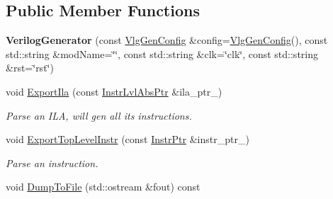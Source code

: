 \subsection*{Public Member Functions}
\begin{DoxyCompactItemize}
\item 
\mbox{\label{classilang_1_1_verilog_generator_abf9c7566b2c958bb7456fa1be6e438b0}} 
{\bfseries Verilog\+Generator} (const \mbox{\hyperlink{structilang_1_1_verilog_generator_1_1_vlg_gen_config}{Vlg\+Gen\+Config}} \&config=\mbox{\hyperlink{structilang_1_1_verilog_generator_1_1_vlg_gen_config}{Vlg\+Gen\+Config}}(), const std\+::string \&mod\+Name=\char`\"{}\char`\"{}, const std\+::string \&clk=\char`\"{}clk\char`\"{}, const std\+::string \&rst=\char`\"{}rst\char`\"{})
\item 
\mbox{\label{classilang_1_1_verilog_generator_acaf4bd577931faa9e057b79ecf179242}} 
void \mbox{\hyperlink{classilang_1_1_verilog_generator_acaf4bd577931faa9e057b79ecf179242}{Export\+Ila}} (const \mbox{\hyperlink{namespaceilang_ad1b30fdf347e493b3937143da05d1a72}{Instr\+Lvl\+Abs\+Ptr}} \&ila\+\_\+ptr\+\_\+)
\begin{DoxyCompactList}\small\item\em Parse an I\+LA, will gen all its instructions. \end{DoxyCompactList}\item 
\mbox{\label{classilang_1_1_verilog_generator_ad0387a0c590560df71b9aecf6853c0b0}} 
void \mbox{\hyperlink{classilang_1_1_verilog_generator_ad0387a0c590560df71b9aecf6853c0b0}{Export\+Top\+Level\+Instr}} (const \mbox{\hyperlink{namespaceilang_af88a19312ae653d687a0d1207bb284f6}{Instr\+Ptr}} \&instr\+\_\+ptr\+\_\+)
\begin{DoxyCompactList}\small\item\em Parse an instruction. \end{DoxyCompactList}\item 
void \mbox{\hyperlink{classilang_1_1_verilog_generator_a4680ff4bed22a6d3f91c5054a6ead09e}{Dump\+To\+File}} (std\+::ostream \&fout) const
\end{DoxyCompactItemize}
